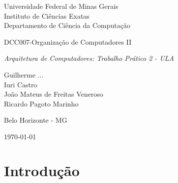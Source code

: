 \documentclass[11pt,a4paper,titlepage]{article}
\newcommand{\titulo}{\textit{Arquitetura de Computadores: Trabalho Prático 2 - ULA}}
\begin{document}
\begin{titlepage}
\begin{center}

\begin{large}
Universidade Federal de Minas Gerais\\
Instituto de Ciências Exatas\\
Departamento de Ciência da Computação\\
\end{large}

\vspace{20mm}

\begin{Large}
DCC007-Organização de Computadores II
\end{Large}

\vspace{20mm}

\begin{LARGE}
\titulo
\end{LARGE}


\vspace{30mm}

\begin{Large}
Guilherme ...\\ Iuri Castro\\ João Mateus de Freitas Veneroso\\ Ricardo Pagoto Marinho \\
\end{Large}


\vspace{60mm}

{\sc Belo Horizonte - MG}

{\sc \today}

\end{center}
\end{titlepage}




\section{Introdução}\label{sec-intro}
\end{document}
